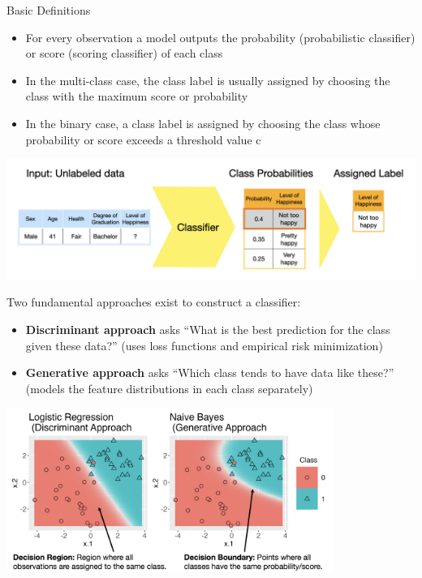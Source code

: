 \documentclass[11pt,compress,t,notes=noshow, xcolor=table]{beamer}
\begin{document}
\begin{vbframe}{Basic Definitions}
\begin{itemize}
\item \small For every observation a model outputs the probability (probabilistic classifier) or score (scoring classifier) of each class
\item \small In the multi-class case, the class label is usually assigned by choosing the class with the maximum score or probability
\item \small In the binary case, a class label is assigned by choosing the class whose probability or score exceeds a threshold value c
\end{itemize}

\vspace{5mm}

\begin{center}
  \includegraphics[width = \textwidth]{figure_man/nutshell-classification-label-assignment.png}
\end{center}

Two fundamental approaches exist to construct a classifier:
\begin{itemize}
\item \small \textbf{Discriminant approach} asks ``What is the best prediction for the class given these data?'' (uses loss functions and empirical risk minimization)
\item \small \textbf{Generative approach} asks ``Which class tends to have data like these?'' (models the feature distributions in each class separately)

\end{itemize}

\begin{center}
  \includegraphics[width = 0.8\textwidth]{figure_man/nutshell_classif_binary_task.png}
\end{center}
\end{vbframe}
\end{document}

